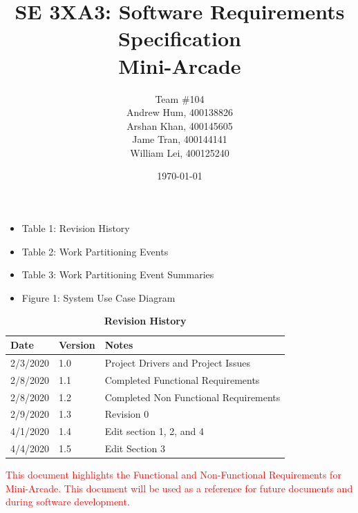 \documentclass[12pt, titlepage]{article}
\title{SE 3XA3: Software Requirements Specification\\Mini-Arcade}
\author{Team \#104
		\\ Andrew Hum, 400138826
		\\ Arshan Khan, 400145605
		\\ Jame Tran, 400144141
		\\ William Lei, 400125240
}
\date{\today}
\begin{document}
\maketitle

\tableofcontents
\listoftables

\begin{itemize}
\item Table 1: Revision History
\item Table 2: Work Partitioning Events
\item Table 3: Work Partitioning Event Summaries
\end{itemize}

\listoffigures

\begin{itemize}
    \item Figure 1: System Use Case Diagram
\end{itemize}

\begin{table}[bp]
\caption{\bf Revision History}
\begin{tabularx}{\textwidth}{p{3cm}p{2cm}X}
\toprule {\bf Date} & {\bf Version} & {\bf Notes}\\
\midrule
2/3/2020 & 1.0 & Project Drivers and Project Issues\\
2/8/2020 & 1.1 & Completed Functional Requirements\\
2/8/2020 & 1.2 & Completed Non Functional Requirements\\
2/9/2020 & 1.3 & Revision 0\\
4/1/2020 & 1.4 & Edit section 1, 2, and 4\\
4/4/2020 & 1.5 & Edit Section 3\\

\bottomrule
\end{tabularx}
\end{table}

\newpage



\textcolor{red}{This document highlights the Functional and Non-Functional Requirements for Mini-Arcade. This document will be used as a reference for future documents and during software development.}
\end{document}
